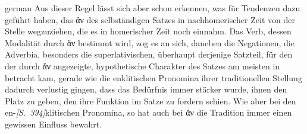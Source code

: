 \begin{otherlanguage*}{german}
Aus dieser Regel lässt sich aber schon erkennen, was für Tendenzen dazu geführt haben, das ἄν des selbständigen Satzes in nachhomerischer Zeit von der Stelle wegzuziehen, die es in homerischer Zeit noch einnahm. Das Verb, dessen Modalität durch ἄν bestimmt wird, zog es an sich, daneben die Negationen, die Adverbia, besonders die superlativischen, überhaupt derjenige Satzteil, für den der durch ἄν angezeigte, hypothetische Charakter des Satzes am meisten in betracht kam, gerade wie die enklitischen Pronomina ihrer traditionellen Stellung dadurch verlustig gingen, dass das Bedürfnis immer stärker wurde, ihnen den Platz zu geben, den ihre Funktion im Satze zu fordern schien. Wie aber bei den en-\hypertarget{p394}{\emph{[S.~394]}}\label{p394}klitischen Pronomina, so hat auch bei ἄν die Tradition immer einen gewissen Einfluss bewahrt.


\end{otherlanguage*}
